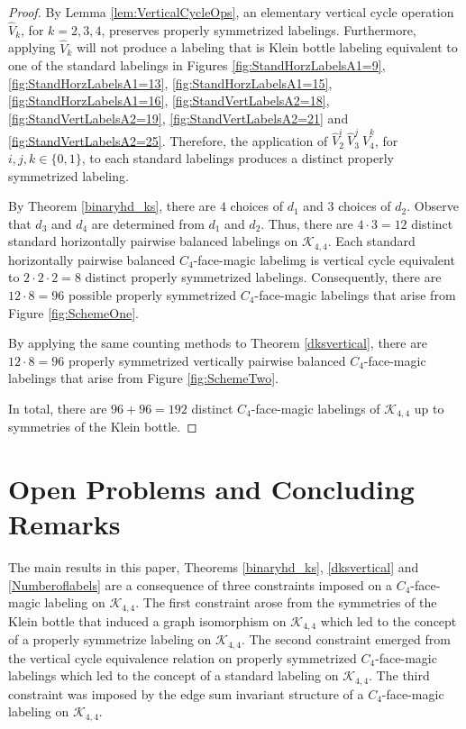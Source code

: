 \documentclass[10pt, reqno]{amsart}
\theoremstyle{definition}
\theoremstyle{plain}
\begin{document}
\begin{proof}
    By Lemma \ref{lem:VerticalCycleOps}, an elementary vertical cycle operation $\widehat{V}_k$, for $k=2,3,4$, 
    preserves properly symmetrized labelings.
    Furthermore, applying $\widehat{V}_k$ will not produce a labeling that is Klein bottle 
    labeling equivalent to one of the standard labelings in Figures \ref{fig:StandHorzLabelsA1=9}, \ref{fig:StandHorzLabelsA1=13}, \ref{fig:StandHorzLabelsA1=15},
    \ref{fig:StandHorzLabelsA1=16}, \ref{fig:StandVertLabelsA2=18}, \ref{fig:StandVertLabelsA2=19}, \ref{fig:StandVertLabelsA2=21} and \ref{fig:StandVertLabelsA2=25}.
   Therefore, the application of $\widehat{V}_2^i\ \widehat{V}_3^j\ \widehat{V}_4^k$,
   for $i,j,k\in\{0,1\}$, to each standard labelings produces a distinct properly symmetrized labeling.

   By Theorem \ref{binaryhd_ks}, there are $4$ choices of $d_1$ and $3$ choices of $d_2$.
   Observe that $d_3$ and $d_4$ are determined from $d_1$ and $d_2$. 
   Thus, there are $4\cdot 3=12$ distinct standard horizontally pairwise balanced labelings on $\mathcal{K}_{4,4}$.  
   Each standard horizontally pairwise balanced $C_4$-face-magic labelimg is
   vertical cycle equivalent to $2\cdot2\cdot 2=8$ distinct 
   properly symmetrized labelings. 
   Consequently, there are $12\cdot 8=96$ possible properly symmetrized 
   $C_4$-face-magic labelings that arise from Figure \ref{fig:SchemeOne}.

     By applying the same counting methods to Theorem \ref{dksvertical}, 
     there are $12\cdot 8=96$ properly symmetrized vertically pairwise 
     balanced $C_4$-face-magic labelings that arise from Figure \ref{fig:SchemeTwo}.
   
    In total, there are $96+96=192$ distinct $C_4$-face-magic labelings of $\mathcal{K}_{4,4}$ up to symmetries of the Klein bottle.
\end{proof}


\section{Open Problems and Concluding Remarks}

The main results in this paper, Theorems \ref{binaryhd_ks}, \ref{dksvertical} and \ref{Numberoflabels}  are a consequence of three constraints imposed on a $C_4$-face-magic
labeling on $\mathcal{K}_{4,4}$.
The first constraint arose from the symmetries of the Klein bottle
that induced a graph isomorphism on $\mathcal{K}_{4,4}$ which led
to the concept of a properly symmetrize labeling on $\mathcal{K}_{4,4}$.
The second constraint emerged from the vertical cycle equivalence relation on
properly symmetrized $C_4$-face-magic labelings which led to the concept of a standard labeling on $\mathcal{K}_{4,4}$.
The third constraint was imposed by the edge sum invariant structure of a $C_4$-face-magic
labeling on $\mathcal{K}_{4,4}$.
\end{document}
